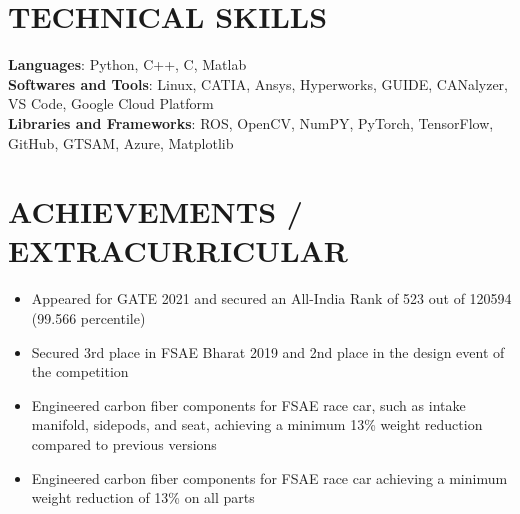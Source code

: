 \documentclass[letterpaper,10.5pt]{article}
\makeatletter
\newcommand{\resumeItem}[1]{
  \item\small{
    {#1 \vspace{-2pt}}
  }
}
\newcommand{\resumeSubheading}[4]{
  \vspace{-2pt}\item
    \begin{tabular*}{1.0\textwidth}[t]{l@{\extracolsep{\fill}}r}
      \textbf{#1} & \textbf{\small #2} \\
      \textit{\small#3} & \textit{\small #4} \\
    \end{tabular*}\vspace{-7pt}
}
\newcommand{\resumeSubHeadingListStart}{\begin{itemize}[leftmargin=0.0in, label={}]}
\newcommand{\resumeSubHeadingListEnd}{\end{itemize}}
\newcommand{\resumeItemListStart}{\begin{itemize}}
\newcommand{\resumeItemListEnd}{\end{itemize}\vspace{-5pt}}
\makeatother
\begin{document}
%
\section{TECHNICAL SKILLS}
 \begin{itemize}[leftmargin=0.15in, label={}]
    \small{\item{
     \textbf{Languages}{: Python, C++, C, Matlab} \\
     \textbf{Softwares and Tools}{: Linux, CATIA, Ansys, Hyperworks, GUIDE, CANalyzer, VS Code, Google Cloud Platform} \\
     \textbf{Libraries and Frameworks}{: ROS, OpenCV, NumPY, PyTorch, TensorFlow, GitHub, GTSAM, Azure, Matplotlib} \\
    }}
 \end{itemize}
 \vspace{-20pt}


\section{ACHIEVEMENTS / EXTRACURRICULAR}
    \resumeItemListStart
        \resumeItem{Appeared for GATE 2021 and secured an All-India Rank of 523 out of 120594 (99.566 percentile)}
        \vspace{-5pt}
        \resumeItem{Secured 3rd place in FSAE Bharat 2019 and 2nd place in the design event of the competition}
        \vspace{-5pt}
        \resumeItem{Engineered carbon fiber components for FSAE race car, such as intake manifold, sidepods, and seat, achieving a minimum 13\% weight reduction compared to previous versions}
        \vspace{-5pt}
        \resumeItem{Engineered carbon fiber components for FSAE race car achieving a minimum weight reduction of 13\% on all parts }
        \vspace{-5pt}
    \resumeItemListEnd
        

\end{document}
